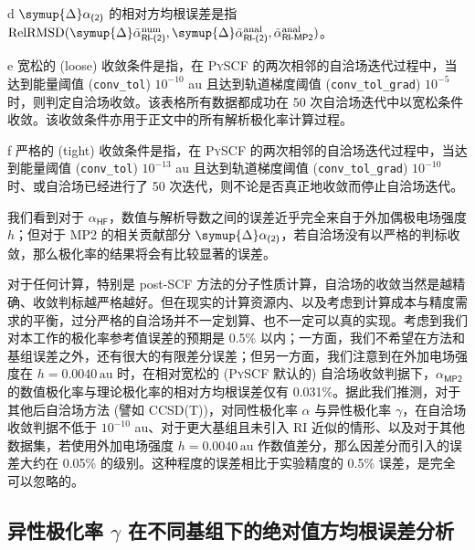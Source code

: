 \begin{table}[ht]
{    \item[d] $\symup{\Delta} \alpha_\textsf{(2)}$ 的相对方均根误差是指 $\text{RelRMSD} (\symup{\Delta} \tilde \alpha^\text{num}_\textsf{RI-(2)}, \symup{\Delta} \tilde \alpha^\text{anal}_\textsf{RI-(2)}, \tilde \alpha^\text{anal}_\textsf{RI-MP2})$。
    \item[e] 宽松的 (loose) 收敛条件是指，在 \textsc{PySCF} 的两次相邻的自洽场迭代过程中，当达到能量阈值 (\texttt{conv\_tol}) $10^{-10}$ au 且达到轨道梯度阈值 (\texttt{conv\_tol\_grad}) $10^{-5}$ 时，则判定自洽场收敛。该表格所有数据都成功在 50 次自洽场迭代中以宽松条件收敛。该收敛条件亦用于正文中的所有解析极化率计算过程。
    \item[f] 严格的 (tight) 收敛条件是指，在 \textsc{PySCF} 的两次相邻的自洽场迭代过程中，当达到能量阈值 (\texttt{conv\_tol}) $10^{-13}$ au 且达到轨道梯度阈值 (\texttt{conv\_tol\_grad}) $10^{-10}$ 时、或自洽场已经进行了 50 次迭代，则不论是否真正地收敛而停止自洽场迭代。
}
\end{table}

我们看到对于 $\alpha_\textsf{HF}$，数值与解析导数之间的误差近乎完全来自于外加偶极电场强度 $h$；但对于 MP2 的相关贡献部分 $\symup{\Delta} \alpha_\textsf{(2)}$，若自洽场没有以严格的判标收敛，那么极化率的结果将会有比较显著的误差。

对于任何计算，特别是 post-SCF 方法的分子性质计算，自洽场的收敛当然是越精确、收敛判标越严格越好。但在现实的计算资源内、以及考虑到计算成本与精度需求的平衡，过分严格的自洽场并不一定划算、也不一定可以真的实现。考虑到我们对本工作的极化率参考值误差的预期是 0.5\% 以内；一方面，我们不希望在方法和基组误差之外，还有很大的有限差分误差；但另一方面，我们注意到在外加电场强度在 $h = 0.0040 \, \text{au}$ 时，在相对宽松的 (\textsc{PySCF} 默认的) 自洽场收敛判据下，$\alpha_\textsf{MP2}$ 的数值极化率与理论极化率的相对方均根误差仅有 0.031\%。据此我们推测，对于其他后自洽场方法 (譬如 CCSD(T))，对同性极化率 $\alpha$ 与异性极化率 $\gamma$，在自洽场收敛判据不低于 $10^{-10}$ au、对于更大基组且未引入 RI 近似的情形、以及对于其他数据集，若使用外加电场强度 $h = 0.0040 \, \text{au}$ 作数值差分，那么因差分而引入的误差大约在 0.05\% 的级别。这种程度的误差相比于实验精度的 0.5\% 误差，是完全可以忽略的。

\subsection{异性极化率 $\gamma$ 在不同基组下的绝对值方均根误差分析}


